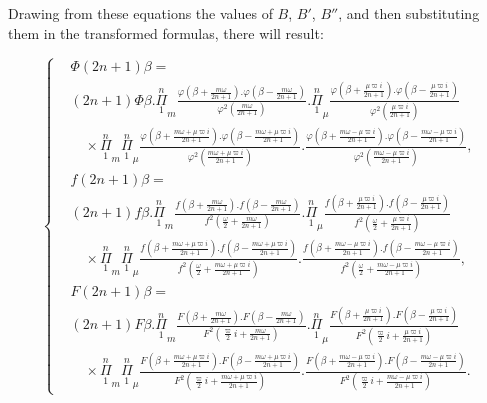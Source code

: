 \documentclass{article}
\begin{document}
Drawing from these equations the values of $B$, $B'$, $B''$, and then substituting them in the transformed formulas, there will result:

\[ \left\{\begin{aligned}
&\Phi(2n+1)\beta=\\
&(2n+1)\Phi\beta.\overset{n}{\underset{1}{\Pi}}_{m}\frac{\varphi\left(\beta+\frac{m\omega}{2n+1}\right).\varphi\left(\beta-\frac{m\omega}{2n+1}\right)}{\varphi^{2}\left(\frac{m\omega}{2n+1}\right)}.\overset{n}{\underset{1}{\Pi}}_{\mu}\frac{\varphi\left(\beta+\frac{\mu\varpi i}{2n+1}\right).\varphi\left(\beta-\frac{\mu\varpi i}{2n+1}\right)}{\varphi^{2}\left(\frac{\mu\varpi i}{2n+1}\right)}\\
&\quad\times\overset{n}{\underset{1}{\Pi}}_{m}\overset{n}{\underset{1}{\Pi}}_{\mu}\frac{\varphi\left(\beta+\frac{m\omega+\mu\varpi i}{2n+1}\right).\varphi\left(\beta-\frac{m\omega+\mu\varpi i}{2n+1}\right)}{\varphi^{2}\left(\frac{m\omega+\mu\varpi i}{2n+1}\right)}.\frac{\varphi\left(\beta+\frac{m\omega-\mu\varpi i}{2n+1}\right).\varphi\left(\beta-\frac{m\omega-\mu\varpi i}{2n+1}\right)}{\varphi^{2}\left(\frac{m\omega-\mu\varpi i}{2n+1}\right)},\\
&f(2n+1)\beta=\\
&(2n+1)f\beta.\overset{n}{\underset{1}{\Pi}}_{m}\frac{f\left(\beta+\frac{m\omega}{2n+1}\right).f\left(\beta-\frac{m\omega}{2n+1}\right)}{f^{2}\left(\frac{\omega}{2}+\frac{m\omega}{2n+1}\right)}.\overset{n}{\underset{1}{\Pi}}_{\mu}\frac{f\left(\beta+\frac{\mu\varpi i}{2n+1}\right).f\left(\beta-\frac{\mu\varpi i}{2n+1}\right)}{f^{2}\left(\frac{\omega}{2}+\frac{\mu\varpi i}{2n+1}\right)}\\
&\quad\times\overset{n}{\underset{1}{\Pi}}_{m}\overset{n}{\underset{1}{\Pi}}_{\mu}\frac{f\left(\beta+\frac{m\omega+\mu\varpi i}{2n+1}\right).f\left(\beta-\frac{m\omega+\mu\varpi i}{2n+1}\right)}{f^{2}\left(\frac{\omega}{2}+\frac{m\omega+\mu\varpi i}{2n+1}\right)}.\frac{f\left(\beta+\frac{m\omega-\mu\varpi i}{2n+1}\right).f\left(\beta-\frac{m\omega-\mu\varpi i}{2n+1}\right)}{f^{2}\left(\frac{\omega}{2}+\frac{m\omega-\mu\varpi i}{2n+1}\right)},\\
&F(2n+1)\beta=\\
&(2n+1)F\beta.\overset{n}{\underset{1}{\Pi}}_{m}\frac{F\left(\beta+\frac{m\omega}{2n+1}\right).F\left(\beta-\frac{m\omega}{2n+1}\right)}{F^{2}\left(\frac{\varpi}{2}i+\frac{m\omega}{2n+1}\right)}.\overset{n}{\underset{1}{\Pi}}_{\mu}\frac{F\left(\beta+\frac{\mu\varpi i}{2n+1}\right).F\left(\beta-\frac{\mu\varpi i}{2n+1}\right)}{F^{2}\left(\frac{\varpi}{2}i+\frac{\mu\varpi i}{2n+1}\right)}\\
&\quad\times\overset{n}{\underset{1}{\Pi}}_{m}\overset{n}{\underset{1}{\Pi}}_{\mu}\frac{F\left(\beta+\frac{m\omega+\mu\varpi i}{2n+1}\right).F\left(\beta-\frac{m\omega+\mu\varpi i}{2n+1}\right)}{F^{2}\left(\frac{\varpi}{2}i+\frac{m\omega+\mu\varpi i}{2n+1}\right)}.\frac{F\left(\beta+\frac{m\omega-\mu\varpi i}{2n+1}\right).F\left(\beta-\frac{m\omega-\mu\varpi i}{2n+1}\right)}{F^{2}\left(\frac{\varpi}{2}i+\frac{m\omega-\mu\varpi i}{2n+1}\right)}.
\end{aligned}\right. \tag{129.} \]
\end{document}
